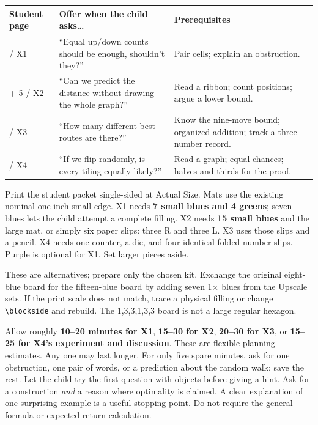 \documentclass[11pt]{article}
\begin{document}
\renewcommand{\arraystretch}{1.10}
\begin{tabularx}{\linewidth}{@{}>{\raggedright\arraybackslash}p{.8in}>{\raggedright\arraybackslash}X >{\raggedright\arraybackslash}p{1.9in}@{}}
\textbf{Student page}&\textbf{Offer when the child asks\ldots}&\textbf{Prerequisites}\\\hline
1 / X1&``Equal up/down counts should be enough, shouldn't they?''&Pair cells; explain an obstruction.\\
2 + 5 / X2&``Can we predict the distance without drawing the whole graph?''&Read a ribbon; count positions; argue a lower bound.\\
3 / X3&``How many different best routes are there?''&Know the nine-move bound; organized addition; track a three-number record.\\
4 / X4&``If we flip randomly, is every tiling equally likely?''&Read a graph; equal chances; halves and thirds for the proof.\\
\end{tabularx}
Print the student packet single-sided at Actual Size. Mats use the existing nominal one-inch small edge. X1 needs \textbf{7 small blues and 4 greens}; seven blues lets the child attempt a complete filling. X2 needs \textbf{15 small blues} and the large mat, or simply six paper slips: three R and three L. X3 uses those slips and a pencil. X4 needs one counter, a die, and four identical folded number slips. Purple is optional for X1. Set larger pieces aside.

These are alternatives; prepare only the chosen kit. Exchange the original eight-blue board for the fifteen-blue board by adding seven 1\(\times\) blues from the Upscale sets. If the print scale does not match, trace a physical filling or change \texttt{\textbackslash blockside} and rebuild. The 1,3,3,1,3,3 board is not a large regular hexagon.

Allow roughly \textbf{10--20 minutes for X1}, \textbf{15--30 for X2}, \textbf{20--30 for X3}, or \textbf{15--25 for X4's experiment and discussion}. These are flexible planning estimates. Any one may last longer. For only five spare minutes, ask for one obstruction, one pair of words, or a prediction about the random walk; save the rest.
Let the child try the first question with objects before giving a hint. Ask for a construction \emph{and} a reason where optimality is claimed. A clear explanation of one surprising example is a useful stopping point. Do not require the general formula or expected-return calculation.
\end{document}
